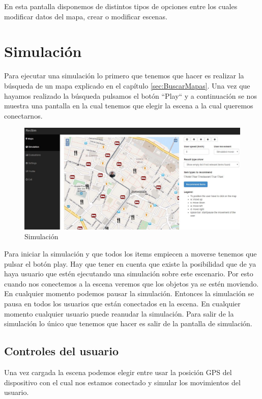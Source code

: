 En esta pantalla disponemos de distintos tipos de opciones entre los cuales modificar datos del mapa, crear o modificar escenas.

\section{Simulación}

Para ejecutar una simulación lo primero que tenemos que hacer es realizar la búsqueda de un mapa explicado en el capítulo \ref{sec:BuscarMapas}. Una vez que hayamos realizado la búsqueda pulsamos el botón ``Play`` y a continuación se nos muestra una pantalla en la cual tenemos que elegir la escena a la cual queremos conectarnos.

\begin{figure}[H]
	\centering\includegraphics[scale=0.35]{imagenes/capitulo11/capitulo11.jpg}
	\caption{Simulación}
	\label{img:Simulation}
\end{figure}

Para iniciar la simulación y que todos los items empiecen a moverse tenemos que pulsar el botón play. Hay que tener en cuenta que existe la posibilidad que de ya haya usuario que estén ejecutando una simulación sobre este escenario. Por esto cuando nos conectemos a la escena veremos que los objetos ya se estén moviendo. En cualquier momento podemos pausar la simulación. Entonces la simulación se pausa en todos los usuarios que están conectados en la escena. En cualquier momento cualquier usuario puede reanudar la simulación. Para salir de la simulación lo único que tenemos que hacer es salir de la pantalla de simulación.

\subsection{Controles del usuario}

Una vez cargada la escena podemos elegir entre usar la posición GPS del dispositivo con el cual nos estamos conectado y simular los movimientos del usuario.


